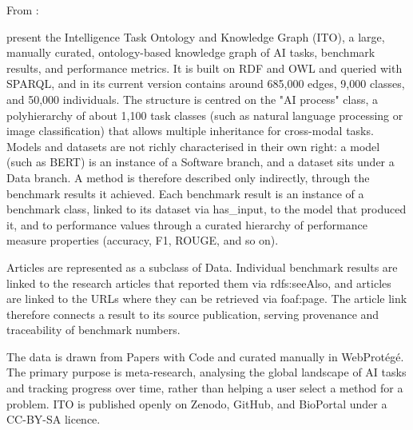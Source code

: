 

From \parencite{blagec2022_benchmark_knowledge_graph}:


\textcite{blagec2022_benchmark_knowledge_graph} present the Intelligence Task Ontology and 
Knowledge Graph (ITO), a large, manually curated, ontology-based 
knowledge graph of AI tasks, benchmark results, and performance 
metrics. It is built on RDF and OWL and queried with SPARQL, and 
in its current version contains around 685,000 edges, 9,000 
classes, and 50,000 individuals. The structure is centred on the 
"AI process" class, a polyhierarchy of about 1,100 task classes 
(such as natural language processing or image classification) 
that allows multiple inheritance for cross-modal tasks. Models 
and datasets are not richly characterised in their own right: a 
model (such as BERT) is an instance of a Software branch, and a 
dataset sits under a Data branch. A method is therefore described 
only indirectly, through the benchmark results it achieved. Each 
benchmark result is an instance of a benchmark class, linked to 
its dataset via has_input, to the model that produced it, and to 
performance values through a curated hierarchy of performance 
measure properties (accuracy, F1, ROUGE, and so on).

Articles are represented as a subclass of Data. Individual 
benchmark results are linked to the research articles that 
reported them via rdfs:seeAlso, and articles are linked to the 
URLs where they can be retrieved via foaf:page. The article 
link therefore connects a result to its source publication, 
serving provenance and traceability of benchmark numbers.

The data is drawn from Papers with Code and curated manually in 
WebProtégé. The primary purpose is meta-research, analysing the 
global landscape of AI tasks and tracking progress over time, 
rather than helping a user select a method for a problem. ITO is 
published openly on Zenodo, GitHub, and BioPortal under a 
CC-BY-SA licence.


